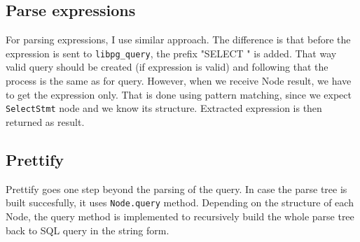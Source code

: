 \subsection{Parse expressions}
For parsing expressions, I use similar approach. The difference is that before the expression is sent to \texttt{libpg\_query}, the prefix "SELECT " is added. That way valid query should be created (if expression is valid) and following that the process is the same as for query. However, when we receive Node result, we have to get the expression only. That is done using pattern matching, since we expect \texttt{SelectStmt} node and we know its structure. Extracted expression is then returned as result.

\subsection{Prettify}
Prettify goes one step beyond the parsing of the query. In case the parse tree is built succesfully, it uses \texttt{Node.query} method. Depending on the structure of each Node, the query method is implemented to recursively build the whole parse tree back to SQL query in the string form.



